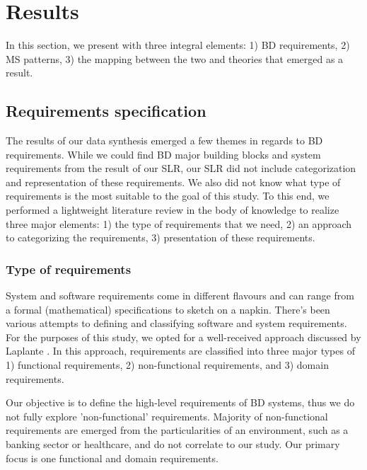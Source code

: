 \documentclass{bmcart}
\begin{document}



\section{Results}

In this section, we present with three integral elements: 1) BD requirements, 2) MS patterns, 3) the mapping between the two and theories that emerged as a result.  

\subsection{Requirements specification} \label{requirementSpec}

The results of our data synthesis emerged a few themes in regards to BD requirements. While we could find BD major building blocks and system requirements from the result of our SLR, our SLR did not include categorization and representation of these requirements. We also did not know what type of requirements is the most suitable to the goal of this study. To this end, we performed a lightweight literature review in the body of knowledge to realize three major elements: 1) the type of requirements that we need, 2) an approach to categorizing the requirements, 3) presentation of these requirements. 

\subsubsection{Type of requirements}
System and software requirements come in different flavours and can range from a formal (mathematical) specifications to sketch on a napkin. There's been various attempts to defining and classifying software and system requirements. For the purposes of this study, we opted for a well-received approach discussed by Laplante \cite{laplante2017requirements}. In this approach, requirements are classified into three major types of 1) functional requirements, 2) non-functional requirements, and 3) domain requirements. 

Our objective is to define the high-level requirements of BD systems, thus we do not fully explore 'non-functional' requirements. Majority of non-functional requirements are emerged from the particularities of an environment, such as a banking sector or healthcare, and do not correlate to our study. Our primary focus is one functional and domain requirements. 
\end{document}

